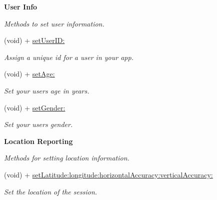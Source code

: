 \begin{Indent}\textbf{ User Info}\par
{\em Methods to set user information. }\begin{DoxyCompactItemize}
\item 
(void) + \hyperlink{interfaceFlurry_a7f1e93aa12021d864af31e327ea368e0}{set\+User\+I\+D\+:}
\begin{DoxyCompactList}\small\item\em Assign a unique id for a user in your app. \end{DoxyCompactList}\item 
(void) + \hyperlink{interfaceFlurry_a55692f576c987dc0ed73a2ba4aa31710}{set\+Age\+:}
\begin{DoxyCompactList}\small\item\em Set your user\textquotesingle{}s age in years. \end{DoxyCompactList}\item 
(void) + \hyperlink{interfaceFlurry_a40c368f4ef3784467f9ba170c37c174f}{set\+Gender\+:}
\begin{DoxyCompactList}\small\item\em Set your user\textquotesingle{}s gender. \end{DoxyCompactList}\end{DoxyCompactItemize}
\end{Indent}
\begin{Indent}\textbf{ Location Reporting}\par
{\em Methods for setting location information. }\begin{DoxyCompactItemize}
\item 
(void) + \hyperlink{interfaceFlurry_a2cbbad5344ba6f6c8d43daede566e0cc}{set\+Latitude\+:longitude\+:horizontal\+Accuracy\+:vertical\+Accuracy\+:}
\begin{DoxyCompactList}\small\item\em Set the location of the session. \end{DoxyCompactList}\end{DoxyCompactItemize}
\end{Indent}
